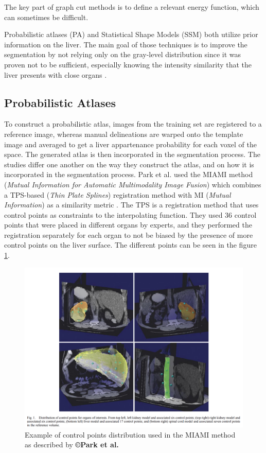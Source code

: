 \documentclass[]{article}
\begin{document}
	The key part of graph cut methods is to define a relevant energy
	function, which can sometimes be difficult.
	
	Probabilistic atlases (PA) and Statistical Shape Models (SSM) both
	utilize prior information on the liver. The main goal of those
	techniques is to improve the segmentation by not relying only on the
	gray-level distribution since it was proven not to be sufficient,
	especially knowing the intensity similarity that the liver presents with
	close organs \cite{Zhou2006, Park2003, Slagmolen2007, Rikxoort2007}.
	
	\subsection*{Probabilistic Atlases}
	
	To construct a probabilistic atlas, images from the training set are
	registered to a reference image, whereas manual delineations are warped
	onto the template image and averaged to get a liver appartenance
	probability for each voxel of the space. The generated atlas is then
	incorporated in the segmentation process. The studies differ one another
	on the way they construct the atlas, and on how it is incorporated in
	the segmentation process. 
	Park et al. used the MIAMI method (\emph{Mutual Information for Automatic
		Multimodality Image Fusion}) which combines a TPS-based (\emph{Thin
		Plate Splines}) registration method with MI (\emph{Mutual Information})
	as a similarity metric \cite{Park2003}. The TPS is a registration method that uses
	control points as constraints to the interpolating function. They used
	36 control points that were placed in different organs by experts, and
	they performed the registration separately for each organ to not be
	biased by the presence of more control points on the liver surface. The
	different points can be seen in the figure \ref{Park2003_Fig1}.
	
	\begin{figure}
		\centering
		\includegraphics[width=0.7\linewidth]{images/image34}
		\caption{Example of control points distribution used in the MIAMI method as described by \textbf{©Park et al.} \cite{Park2003}}
		\label{Park2003_Fig1}
	\end{figure}
	
\end{document}
